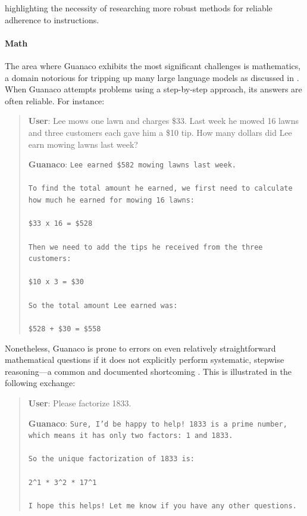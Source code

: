 highlighting the necessity of researching more robust methods for reliable adherence to instructions.

\paragraph{Math} The area where {Guanaco} exhibits the most significant challenges is mathematics, a domain notorious for tripping up many large language models as discussed in \citep{liang2022holistic}. When {Guanaco} attempts problems using a step-by-step approach, its answers are often reliable. For instance:

\begin{quote}
    \textbf{User}: Lee mows one lawn and charges \$33. Last week he mowed 16 lawns and three customers each gave him a \$10 tip. How many dollars did Lee earn mowing lawns last week?

    \textbf{Guanaco}: \texttt{Lee earned \$582 mowing lawns last week. \\ \\ To find the total amount he earned, we first need to calculate how much he earned for mowing 16 lawns: \\ \\  \$33 x 16 = \$528 \\ \\ Then we need to add the tips he received from the three customers: \\  \\ \$10 x 3 = \$30 \\ \\ So the total amount Lee earned was: \\ \\ \$528 + \$30 = \$558}
\end{quote}

Nonetheless, {Guanaco} is prone to errors on even relatively straightforward mathematical questions if it does not explicitly perform systematic, stepwise reasoning—a common and documented shortcoming \cite{weichain}. This is illustrated in the following exchange:

\begin{quote}
    \textbf{User}: Please factorize 1833.

    \textbf{Guanaco}: \texttt{Sure, I'd be happy to help! 1833 is a prime number, which means it has only two factors: 1 and 1833. \\ \\ So the unique factorization of 1833 is: \\ \\ 2\^{}1 * 3\^{}2 * 17\^{}1 \\ \\ I hope this helps! Let me know if you have any other questions.}
\end{quote}

